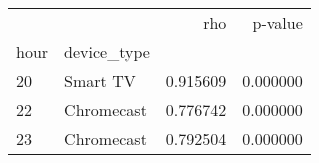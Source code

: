 \begin{tabular}{llrr}
\toprule
 &  & rho & p-value \\
hour & device_type &  &  \\
\midrule
20 & Smart TV & 0.915609 & 0.000000 \\
\cline{1-4}
22 & Chromecast & 0.776742 & 0.000000 \\
\cline{1-4}
23 & Chromecast & 0.792504 & 0.000000 \\
\cline{1-4}
\bottomrule
\end{tabular}
